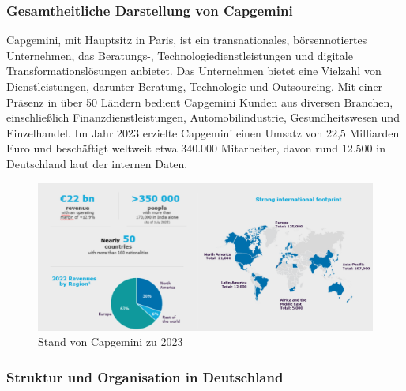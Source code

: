 \documentclass[a4paper, 12pt]{scrartcl}
\begin{document}
	\subsubsection{Gesamtheitliche Darstellung von Capgemini} %
Capgemini, mit Hauptsitz in Paris, ist ein transnationales, börsennotiertes Unternehmen, das Beratungs-, Technologiedienstleistungen und digitale Transformationslösungen anbietet. Das Unternehmen bietet eine Vielzahl von Dienstleistungen, darunter Beratung, Technologie und Outsourcing. Mit einer Präsenz in über 50 Ländern bedient Capgemini Kunden aus diversen Branchen, einschließlich Finanzdienstleistungen, Automobilindustrie, Gesundheitswesen und Einzelhandel. Im Jahr 2023 erzielte Capgemini einen Umsatz von 22,5 Milliarden Euro und beschäftigt weltweit etwa 340.000 Mitarbeiter, davon rund 12.500 in Deutschland laut der internen Daten.
	\begin{figure}[h]
		\begin{center}
			\includegraphics[width=12cm]{CApgemini zahlen.png}
			\caption{Stand von Capgemini zu 2023}
			\label{Stand von Capgemini}
		\end{center}
	\end{figure}
	\subsubsection{Struktur und Organisation in Deutschland}
\end{document}

